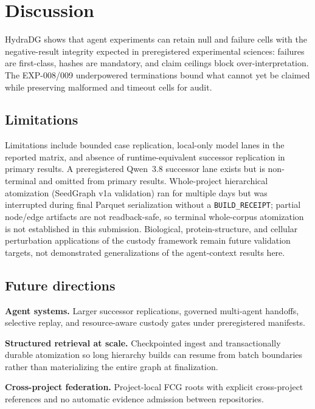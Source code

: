 \documentclass{article}
\begin{document}
\section{Discussion}

HydraDG shows that agent experiments can retain null and failure cells with the negative-result integrity expected in preregistered experimental sciences: failures are first-class, hashes are mandatory, and claim ceilings block over-interpretation.
The EXP-008/009 underpowered terminations bound what cannot yet be claimed while preserving malformed and timeout cells for audit.

\subsection{Limitations}
\label{sec:limitations}

Limitations include bounded case replication, local-only model lanes in the reported matrix, and absence of runtime-equivalent successor replication in primary results.
A preregistered Qwen~3.8 successor lane exists but is non-terminal and omitted from primary results.
Whole-project hierarchical atomization (SeedGraph v1a validation) ran for multiple days but was interrupted during final Parquet serialization without a \texttt{BUILD\_RECEIPT}; partial node/edge artifacts are not readback-safe, so terminal whole-corpus atomization is not established in this submission.
Biological, protein-structure, and cellular perturbation applications of the custody framework remain future validation targets, not demonstrated generalizations of the agent-context results here.

\subsection{Future directions}

\textbf{Agent systems.} Larger successor replications, governed multi-agent handoffs, selective replay, and resource-aware custody gates under preregistered manifests.

\textbf{Structured retrieval at scale.} Checkpointed ingest and transactionally durable atomization so long hierarchy builds can resume from batch boundaries rather than materializing the entire graph at finalization.

\textbf{Cross-project federation.} Project-local FCG roots with explicit cross-project references and no automatic evidence admission between repositories.
\end{document}
